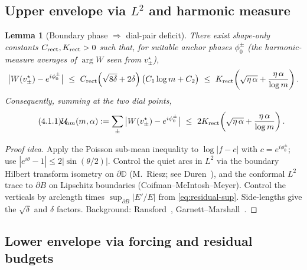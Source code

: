 \documentclass[11pt]{article}
\numberwithin{equation}{section}
\newtheorem{lemma}[theorem]{Lemma}
\theoremstyle{remark}
\newcommand{\D}{\mathbb{D}}
\begin{document}
\subsection{Upper envelope via $L^2$ and harmonic measure}\label{subsec:upper}

\begin{lemma}[Boundary phase $\Rightarrow$ dial-pair deficit]\label{lem:upper-envelope}
There exist \emph{shape-only} constants $C_{\rm rect},K_{\rm rect}>0$ such that, for suitable anchor phases $\phi_0^\pm$ (the harmonic-measure averages of $\arg W$ seen from $v_\pm^\star$),
\begin{equation}\label{eq:upper-point}
\big|W(v_\pm^\star)-e^{i\phi_0^\pm}\big|
\ \le\ C_{\rm rect}\Big(\sqrt{8\delta}+2\delta\Big)\,\big(C_1\log m+C_2\big)
\ \le\ K_{\rm rect}\!\left(\sqrt{\eta\,\alpha}+\frac{\eta\,\alpha}{\log m}\right).
\end{equation}
Consequently, summing at the two dial points,
\begin{equation}\tag{4.1.1}\label{eq:Uhm}
\mathcal{U}_{\!hm}(m,\alpha)
:=\sum_{\pm}\big|W(v_\pm^\star)-e^{i\phi_0^\pm}\big|
\ \le\ 2K_{\rm rect}\!\left(\sqrt{\eta\,\alpha}+\frac{\eta\,\alpha}{\log m}\right).
\end{equation}
\end{lemma}

\begin{proof}[Proof idea]
Apply the Poisson sub-mean inequality to $\log|f-c|$ with $c=e^{i\phi_0^\pm}$; use $|e^{i\theta}-1|\le 2|\sin(\theta/2)|$. Control the quiet arcs in $L^2$ via the boundary Hilbert transform isometry on $\partial\D$ (M.~Riesz; see Duren~\cite[§§I.3, I.6--I.7]{DurenHp}), and the conformal $L^2$ trace to $\partial B$ on Lipschitz boundaries (Coifman--McIntosh--Meyer). Control the verticals by arclength times $\sup_{\partial B}|E'/E|$ from \eqref{eq:residual-sup}. Side-lengths give the $\sqrt{\delta}$ and $\delta$ factors. Background: Ransford~\cite[§3.9]{Ransford}, Garnett--Marshall~\cite[Chs.~IV--V]{GarnettMarshall}.
\end{proof}

\subsection{Lower envelope via forcing and residual budgets}\label{subsec:lower}
\end{document}
